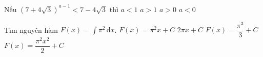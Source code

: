 \begin{ex}%
	Nếu $\left(7+4\sqrt{3}\right)^{a-1}<7-4\sqrt{3}$ thì
	\choice
	{$a<1$}
	{$a>1$}
	{$a>0$}
	{\True $a<0$}
\end{ex}
\begin{ex}%
	Tìm nguyên hàm $F(x)=\displaystyle\int\limits{\pi^2\mathrm{\,d}x}$.
	\choice
	{\True $F(x)=\pi^2x+C$}
	{$2\pi x+C$}
	{$F(x)=\dfrac{\pi^3}{3}+C$}
	{$F(x)=\dfrac{\pi^2x^2}{2}+C$}
\end{ex}
